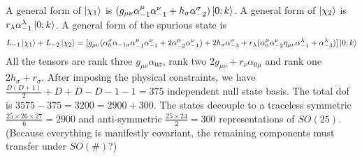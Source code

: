 \documentclass[12pt]{article}
\begin{document}
A general form of $\ket{\chi_1}$ is $(g_{\mu\nu}\alpha_{-1}^\mu\alpha_{-1}^\nu+h_\sigma\alpha_{-2}^\sigma)\ket{0;k}$. A general form of $\ket{\chi_2}$ is $r_\lambda\alpha_{-1}^\lambda\ket{0;k}$. A general form of the spurious state is \\
\begin{equation}
\begin{aligned}[t]
L_{-1}\ket{\chi_1}+L_{-2}\ket{\chi_2}=[g_{\mu\nu}(\alpha_0^\sigma\alpha_{-1 \sigma}\alpha_{-1}^\mu\alpha_{-1}^\nu+2\alpha_{-2}^\mu\alpha_{-1}^\nu)+2h_\sigma\alpha_{-3}^\sigma
+r_\lambda(\alpha_0^\mu\alpha_{-2}^\nu\eta_{\mu\nu}\alpha_{-1}^\lambda+\alpha_{-3}^\lambda)]\ket{0;k}
\end{aligned}
\end{equation}  
All the tensors are rank three $g_{\mu\nu}\alpha_{0 \sigma}$, rank two $2g_{\mu\nu}+r_\nu\alpha_{0 \mu}$ and rank one $2h_\sigma+r_\sigma$. After imposing the physical constraints, we have $\frac{D(D+1)}{2}+D+D-D-1-1=375$ independent null state basis. The total dof is $3575-375=3200=2900+300$. The states decouple to a traceless symmetric $\frac{25\times 26\times 27}{6}=2900$ and anti-symmetric $\frac{25\times 24}{2}=300$ representations of $SO(25)$. (Because everything is manifestly covariant, the remaining components must transfer under $SO(\#)$?)
\end{document}
